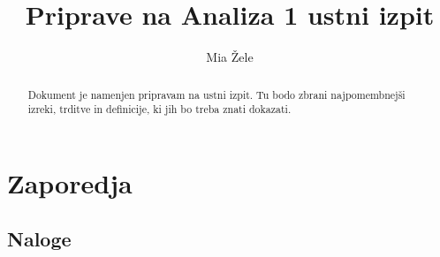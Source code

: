 \documentclass[a4paper,12pt]{report}
\begin{document}
\title{Priprave na Analiza 1 ustni izpit}
\author{Mia Žele}
\date{}

\maketitle

\tableofcontents

\begin{abstract}
    Dokument je namenjen pripravam na ustni izpit. Tu bodo zbrani najpomembnejši
    izreki, trditve in definicije, ki jih bo treba znati dokazati.
\end{abstract}


% 
% 
% 


\chapter{Zaporedja}

\section*{Naloge}
\end{document}
